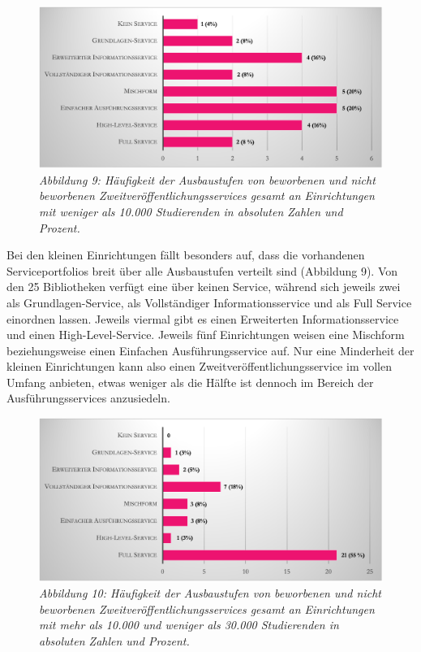 \documentclass[a4paper,
fontsize=11pt,
oneside,
numbers=noperiodatend,
parskip=half-,
bibliography=totoc,
final
]{scrartcl}
\begin{document}
\begin{figure}[h!]
\centering
\includegraphics[width=.9\textwidth]{img/abb9.png}
\caption{\textit{Abbildung 9: Häufigkeit der Ausbaustufen von beworbenen und
nicht beworbenen Zweitveröffentlichungsservices gesamt an Einrichtungen
mit weniger als 10.000 Studierenden in absoluten Zahlen und Prozent.}}
\end{figure}

Bei den kleinen Einrichtungen fällt besonders auf, dass die vorhandenen
Serviceportfolios breit über alle Ausbaustufen verteilt sind (Abbildung
9). Von den 25 Bibliotheken verfügt eine über keinen Service, während
sich jeweils zwei als Grundlagen-Service, als Vollständiger
Informationsservice und als Full Service einordnen lassen. Jeweils
viermal gibt es einen Erweiterten Informationsservice und einen
High-Level-Service. Jeweils fünf Einrichtungen weisen eine Mischform
beziehungsweise einen Einfachen Ausführungsservice auf. Nur eine
Minderheit der kleinen Einrichtungen kann also einen
Zweitveröffentlichungsservice im vollen Umfang anbieten, etwas weniger
als die Hälfte ist dennoch im Bereich der Ausführungsservices
anzusiedeln.

\begin{figure}[h!]
\centering
\includegraphics[width=.9\textwidth]{img/abb10.png}
\caption{\textit{Abbildung 10: Häufigkeit der Ausbaustufen von beworbenen und
nicht beworbenen Zweitveröffentlichungsservices gesamt an Einrichtungen
mit mehr als 10.000 und weniger als 30.000 Studierenden in absoluten
Zahlen und Prozent.}}
\end{figure}
\end{document}
